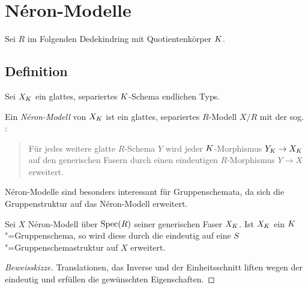 \documentclass[german]{scrreprt}
\begin{document}


\chapter{Néron-Modelle}
Sei $R$ im Folgenden Dedekindring mit Quotientenkörper $K$.
\section{Definition}
\begin{Definition}
  Sei $X_{K}$ ein glattes, separiertes $K$-Schema endlichen Typs.

  Ein \emph{Néron-Modell} von $X_{K}$ ist ein glattes, separiertes
  $R$-Modell $X/R$ %
  mit der sog. \emph{\NAbbEig}:
  \begin{quote}
    Für jedes weitere glatte $R$-Schema $Y$ wird jeder
    $K$-Morphismus $Y_{K}\to X_{K}$ auf den generischen Fasern durch
    einen eindeutigen $R$-Morphismus $Y\to X$ erweitert.
  \end{quote}
\end{Definition}

Néron-Modelle sind besonders interessant für Gruppenschemata, da sich
die Gruppenstruktur auf das Néron-Modell erweitert.
\begin{Bemerkung}\label{thm:gruppenschemaerweiterung}
  Sei $X$ Néron-Modell über $\operatorname{Spec}(R)$ seiner generischen Faser
  $X_{K}$. Ist $X_{K}$ ein $K$"=Gruppenschema, so wird diese durch die
  \NAbbEig eindeutig auf eine
  $S$"=Gruppenschemastruktur auf $X$ erweitert.
  \begin{proof}[Beweisskizze]
    Translationen, das Inverse und der Einheitsschnitt liften wegen
    der \NAbbEig eindeutig und erfüllen die gewünschten Eigenschaften.
  \end{proof}
\end{Bemerkung}
\end{document}
